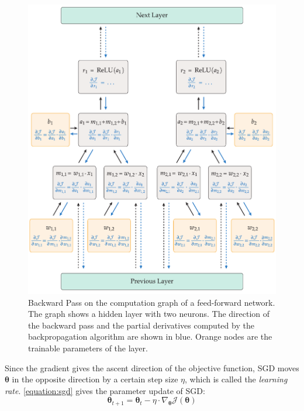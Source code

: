 \begin{figure}
    \centering
    \includegraphics[height=0.85\textheight]{figures/backprop.pdf}
    \caption[Backward Pass on a Computation Graph]
    {Backward Pass on the computation graph of a 
    feed-forward network. The graph
    shows a hidden layer with two neurons. 
    The direction of the backward pass and the partial
    derivatives computed by the backpropagation algorithm
    are shown in blue. Orange nodes are the trainable 
    parameters of the layer. 
    }
    \label{figure:backprop}
\end{figure}


Since the gradient gives the ascent direction
of the objective function, \ac{SGD} moves
 $\bm{\theta}$ in the 
opposite direction
by a certain step size $\eta$, which
is called the \textit{learning rate}. 
\autoref{equation:sgd} gives the parameter update 
of \ac{SGD}:
\begin{equation} \label{equation:sgd}
    \bm{\theta}_{t+1} = \bm{\theta}_t - \eta \cdot \nabla_{\bm{\theta}} \mathcal{J}(\bm{\theta})
\end{equation} 

